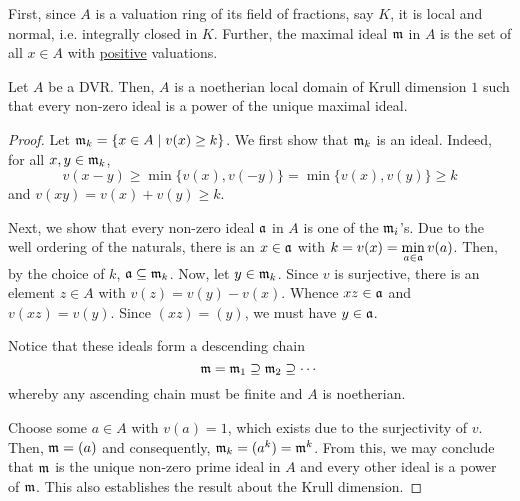 First, since $A$ is a valuation ring of its field of fractions, say $K$, it is local and normal, i.e. integrally closed in $K$. Further, the maximal ideal $\mathfrak m$ in $A$ is the set of all $x\in A$ with \underline{positive} valuations.

\begin{proposition}
    Let $A$ be a DVR. Then, $A$ is a noetherian local domain of Krull dimension $1$ such that every non-zero ideal is a power of the unique maximal ideal.
\end{proposition}
\begin{proof}
    Let $\mathfrak m_k = \{x\in A\mid v(x)\ge k\}$. We first show that $\mathfrak m_k$ is an ideal. Indeed, for all $x,y\in\mathfrak m_k$, 
    \begin{equation*}
        v(x - y)\ge\min\{v(x), v(-y)\} = \min\{v(x),v(y)\}\ge k
    \end{equation*}
    and $v(xy) = v(x) + v(y)\ge k$.

    Next, we show that every non-zero ideal $\mathfrak a$ in $A$ is one of the $\mathfrak m_i$'s. Due to the well ordering of the naturals, there is an $x\in\mathfrak a$ with $\displaystyle k = v(x) = \min_{a\in\mathfrak a}v(a)$. Then, by the choice of $k$, $\mathfrak a\subseteq\mathfrak m_k$. Now, let $y\in\mathfrak m_k$. Since $v$ is surjective, there is an element $z\in A$ with $v(z) = v(y) - v(x)$. Whence $xz\in\mathfrak a$ and $v(xz) = v(y)$. Since $(xz) = (y)$, we must have $y\in\mathfrak a$.

    Notice that these ideals form a descending chain 
    \begin{equation*}
        \mathfrak m = \mathfrak m_1\supseteq\mathfrak m_2\supseteq\cdots
    \end{equation*}
    whereby any ascending chain must be finite and $A$ is noetherian.

    Choose some $a\in A$ with $v(a) = 1$, which exists due to the surjectivity of $v$. Then, $\mathfrak m = (a)$ and consequently, $\mathfrak m_k = (a^k) = \mathfrak m^k$. From this, we may conclude that $\mathfrak m$ is the unique non-zero prime ideal in $A$ and every other ideal is a power of $\mathfrak m$. This also establishes the result about the Krull dimension.
\end{proof}


